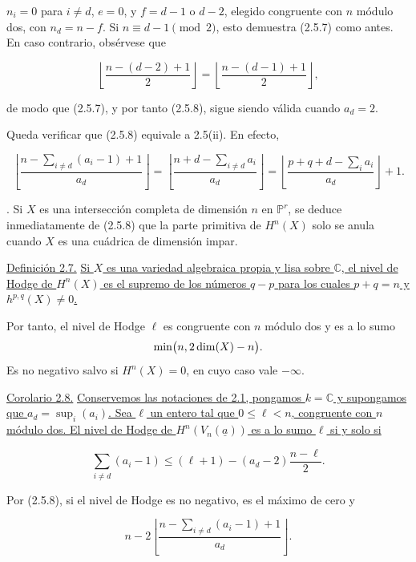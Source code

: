 $n_i=0$ para $i\ne d$, $e=0$, y $f=d-1$ o $d-2$, elegido congruente con
$n$ módulo dos, con $n_d=n-f$. Si $n\equiv d-1\pmod2$, esto demuestra
(2.5.7) como antes. En caso contrario, obsérvese que

\begin{equation*}
\left\lfloor\frac{n-(d-2)+1}{2}\right\rfloor
=\left\lfloor\frac{n-(d-1)+1}{2}\right\rfloor,
\end{equation*}

de modo que (2.5.7), y por tanto (2.5.8), sigue siendo válida cuando
$a_d=2$.

Queda verificar que (2.5.8) equivale a 2.5(ii). En efecto,

\begin{equation*}
\left\lfloor\frac{n-\sum_{i\ne d}(a_i-1)+1}{a_d}\right\rfloor
=\left\lfloor\frac{n+d-\sum_{i\ne d}a_i}{a_d}\right\rfloor
=\left\lfloor\frac{p+q+d-\sum_i a_i}{a_d}\right\rfloor+1.
\end{equation*}

\medskip
{}. Si $X$ es una intersección completa de dimensión $n$ en
$\mathbb P^r$, se deduce inmediatamente de (2.5.8) que la parte primitiva
de $H^n(X)$ solo se anula cuando $X$ es una cuádrica de dimensión impar.

\medskip
\noindent\underline{Definición 2.7.}\quad
\underline{Si $X$ es una variedad algebraica propia y lisa sobre
$\mathbb C$, el nivel de Hodge de $H^n(X)$ es el supremo de los números
$q-p$ para los cuales $p+q=n$ y $h^{p,q}(X)\ne0$.}

Por tanto, el nivel de Hodge $\ell$ es congruente con $n$ módulo dos y es a
lo sumo
\[
\min\bigl(n,\sisi{\dim(X)-n}{2\dim(X)-n}\bigr).
\]
Es no negativo salvo si $H^n(X)=0$, en cuyo caso vale $-\infty$.

\medskip
\noindent\underline{Corolario 2.8.}\quad
\underline{Conservemos las notaciones de 2.1, pongamos $k=\mathbb C$ y
supongamos que $a_d=\sup_i(a_i)$. Sea $\ell$ un entero tal que
$0\leq\ell<n$, congruente con $n$ módulo dos. El nivel de Hodge de
$H^n(V_n(\underline a))$ es a lo sumo $\ell$ si y solo si}

\pageoriginale

\begin{equation*}
\sum_{i\ne d}(a_i-1)
\leq(\ell+1)-(a_d-2)\frac{n-\ell}{2}.
\end{equation*}

Por (2.5.8), si el nivel de Hodge es no negativo, es el máximo de cero y

\begin{equation*}
n-2\left\lfloor
\frac{n-\sum_{i\ne d}(a_i-1)+1}{a_d}
\right\rfloor.
\end{equation*}

